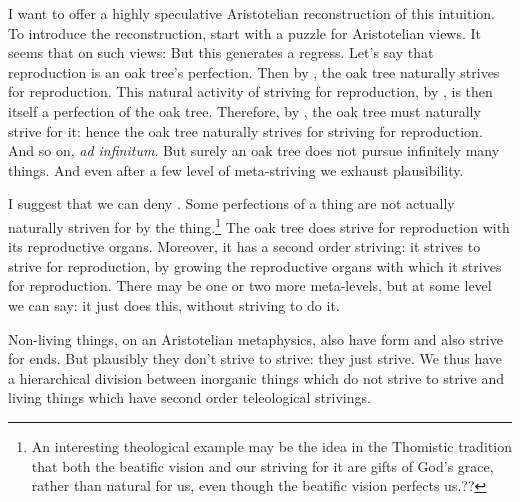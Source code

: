 I want to offer a highly speculative Aristotelian reconstruction of this intuition. To introduce the reconstruction, start with a puzzle for
Aristotelian views. It seems that on such views:
But this generates a regress. Let's say that reproduction is an oak tree's perfection. Then by , the oak tree naturally strives for
reproduction. This natural activity of striving for reproduction, by , is then itself a perfection of the oak tree. Therefore,
by , the oak tree must naturally strive for it: hence the oak tree naturally strives for striving for reproduction. And so on,
\textit{ad infinitum}. But surely an oak tree does not pursue infinitely many things. And even after a few level of meta-striving we exhaust plausibility.

I suggest that we can deny . Some perfections of a thing are not actually naturally striven for by the thing.\footnote{An interesting
theological example may be the idea in the Thomistic tradition that both the beatific vision and our striving for it are gifts of God's grace, rather than
natural for us, even though the beatific vision perfects us.??} The oak tree does strive for reproduction with its reproductive organs. Moreover, it has a
second order striving: it strives to strive for reproduction, by growing the reproductive organs with which it strives for reproduction. There may be one or
two more meta-levels, but at some level we can say: it just does this, without striving to do it.

Non-living things, on an Aristotelian metaphysics, also have form and also strive for ends. But plausibly they don't strive to strive: they just strive.
We thus have a hierarchical division between inorganic things which do not strive to strive and living things which have second order teleological strivings.

